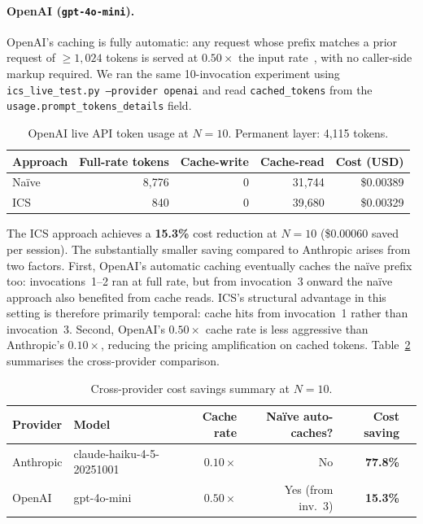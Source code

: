 \documentclass[11pt]{article}
\begin{document}
\paragraph{OpenAI (\texttt{gpt-4o-mini}).}
OpenAI's caching is fully automatic: any request whose prefix matches a prior
request of $\geq{1{,}024}$ tokens is served at $0.50\times$ the input
rate~\citep{openai2024caching}, with no caller-side markup required. We ran
the same 10-invocation experiment using \texttt{ics\_live\_test.py --provider openai}
and read \texttt{cached\_tokens} from the \texttt{usage.prompt\_tokens\_details}
field.

\begin{table}[h]
\centering
\caption{OpenAI live API token usage at $N{=}10$. Permanent layer: 4,115 tokens.}
\label{tab:live-openai}
\begin{tabular}{lrrrr}
\toprule
\textbf{Approach} & \textbf{Full-rate tokens} & \textbf{Cache-write} & \textbf{Cache-read} & \textbf{Cost (USD)} \\
\midrule
Na\"{i}ve & 8,776  & 0      & 31,744 & \$0.00389 \\
ICS       & 840    & 0      & 39,680 & \$0.00329 \\
\bottomrule
\end{tabular}
\end{table}

The ICS approach achieves a \textbf{15.3\%} cost reduction at $N{=}10$
(\$0.00060 saved per session). The substantially smaller saving compared to
Anthropic arises from two factors. First, OpenAI's automatic caching eventually
caches the na\"{i}ve prefix too: invocations~1--2 ran at full rate, but from
invocation~3 onward the na\"{i}ve approach also benefited from cache reads.
ICS's structural advantage in this setting is therefore primarily temporal:
cache hits from invocation~1 rather than invocation~3. Second, OpenAI's
$0.50\times$ cache rate is less aggressive than Anthropic's $0.10\times$,
reducing the pricing amplification on cached tokens. Table~\ref{tab:savings-summary}
summarises the cross-provider comparison.

\begin{table}[h]
\centering
\caption{Cross-provider cost savings summary at $N{=}10$.}
\label{tab:savings-summary}
\begin{tabular}{llrrrr}
\toprule
\textbf{Provider} & \textbf{Model} & \textbf{Cache rate} & \textbf{Na\"{i}ve auto-caches?} & \textbf{Cost saving} \\
\midrule
Anthropic & claude-haiku-4-5-20251001 & $0.10\times$ & No  & \textbf{77.8\%} \\
OpenAI    & gpt-4o-mini               & $0.50\times$ & Yes (from inv.\ 3) & \textbf{15.3\%} \\
\bottomrule
\end{tabular}
\end{table}
\end{document}
